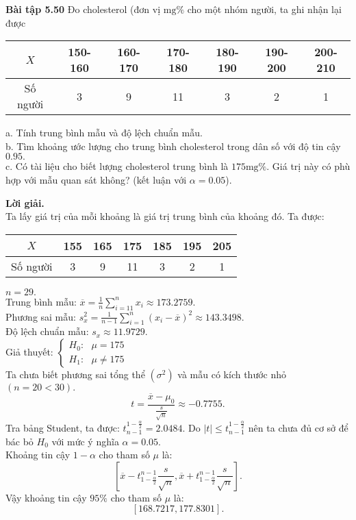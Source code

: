 \begin{mybox}
\textbf{Bài tập 5.50} Đo cholesterol (đơn vị $\mathrm{mg}\%$ cho một nhóm người, ta ghi nhận lại được
\begin{table}[H]
\begin{tabular}{|c|c|c|c|c|c|c|}
\hline 
$X$ & 150-160 & 160-170 & 170-180 & 180-190 & 190-200 & 200-210 \\ 
\hline 
Số người & 3 & 9 & 11 & 3 & 2 & 1 \\ 
\hline 
\end{tabular} 
\end{table}
a. Tính trung bình mẫu và độ lệch chuẩn mẫu.\\
b. Tìm khoảng ước lượng cho trung bình cholesterol trong dân số với độ tin cậy $0.95.$\\
c. Có tài liệu cho biết lượng cholesterol trung bình là $175\mathrm{mg}\%.$ Giá trị này có phù hợp với mẫu quan sát không? (kết luận với $\alpha = 0.05$).
\end{mybox}
\textbf{Lời giải.}\\
Ta lấy giá trị của mỗi khoảng là giá trị trung bình của khoảng đó. Ta được:
\begin{table}[H]
\begin{tabular}{|c|c|c|c|c|c|c|}
\hline 
$X$ & 155 & 165 & 175 & 185 & 195 & 205 \\ 
\hline 
Số người & 3 & 9 & 11 & 3 & 2 & 1 \\ 
\hline 
\end{tabular} 
\end{table}
$n = 29.$\\
Trung bình mẫu:
$\overline x  = \frac{1}{n}\sum\limits_{i =1 1}^n {{x_i}}  \approx 173.2759.$\\
Phương sai mẫu: $s_x^2 = \frac{1}{{n - 1}}\sum\limits_{i = 1}^n {{{\left( {{x_i} - \overline x } \right)}^2}}  \approx 143.3498.$\\
Độ lệch chuẩn mẫu: ${s_x} \approx 11.9729.$\\
Giả thuyết: $\begin{cases}
H_0: \text{ } \mu = 175\\
H_1: \text{ } \mu \ne 175
\end{cases} $ \\
Ta chưa biết phương sai tổng thể $\left( {\sigma^2} \right)$ và mẫu có kích thước nhỏ $\left( {n = 20 < 30} \right).$
$$t = \frac{\overline{x} - \mu_0}{\frac{s}{\sqrt{n}}} \approx -0.7755.$$
Tra bảng Student, ta được: $t_{n - 1}^{1 - \frac{\alpha}{2}} = 2.0484.$
Do $\left| t \right| \leqslant t_{n - 1}^{1 - \frac{\alpha}{2}}$ nên ta chưa đủ cơ sở để bác bỏ $H_0$ với mức ý nghĩa $\alpha = 0.05.$\\
Khoảng tin cậy $1 - \alpha$ cho tham số $\mu$ là:
$$\left[ {\overline x  - t_{1 - \frac{\alpha }{2}}^{n - 1}\frac{s}{{\sqrt n }},\overline x  + t_{1 - \frac{\alpha }{2}}^{n - 1}\frac{s}{{\sqrt n }}} \right].$$
Vậy khoảng tin cậy $95\%$ cho tham số $\mu$ là:
$$\left[ {168.7217, 177.8301} \right].$$

